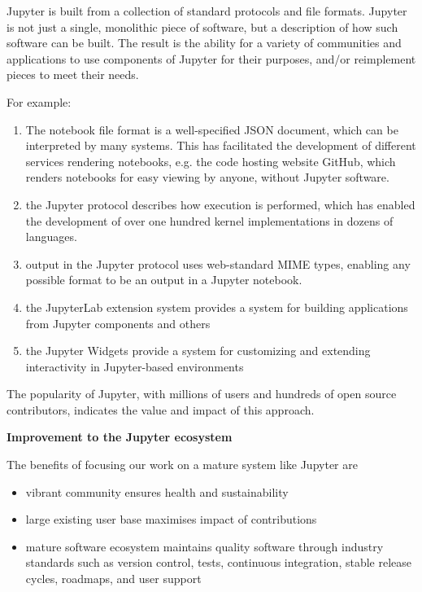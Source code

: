 Jupyter is built from a collection of standard protocols and file
formats.  Jupyter is not just a single, monolithic piece of
software, but a description of how such software can be built.  The
result is the ability for a variety of communities and applications to
use components of Jupyter for their purposes, and/or reimplement pieces to
meet their needs.

For example:

\begin{enumerate}
\item The notebook file format is a well-specified JSON document,
  which can be interpreted by many systems.  This has facilitated the
  development of different services rendering notebooks, e.g. the code
  hosting website GitHub, which renders notebooks for easy viewing by
  anyone, without Jupyter software.
\item the Jupyter protocol describes how execution is performed, which
  has enabled the development of over one hundred kernel
  implementations in dozens of languages.
\item output in the Jupyter protocol uses web-standard MIME types,
  enabling any possible format to be an output in a Jupyter notebook.
\item the JupyterLab extension system provides a system for building
  applications from Jupyter components and others
\item the Jupyter Widgets provide a system for customizing and
  extending interactivity in Jupyter-based environments
\end{enumerate}

The popularity of Jupyter, with millions of users and hundreds of open
source contributors, indicates the value and impact of this approach.

\medskip
\textbf{Improvement to the Jupyter ecosystem}

The benefits of focusing our work on a mature system like Jupyter are

\begin{itemize}
\item vibrant community ensures health and sustainability
\item large existing user base maximises impact of contributions
\item mature software ecosystem maintains quality software through
  industry standards such as version control, tests, continuous
  integration, stable release cycles, roadmaps, and user support
\end{itemize}


